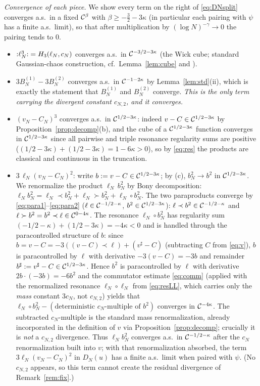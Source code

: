\emph{Convergence of each piece.}
We show every term on the right of \eqref{eq:DNsplit} converges a.s.\ in a fixed
$\mathcal{C}^{\beta}$ with $\beta\ge-\tfrac32-3\kappa$ (in particular each pairing with
$\psi$ has a finite a.s.\ limit), so that after multiplication by
$(\log N)^{-\gamma}\to0$ the pairing tends to $0$.
\begin{itemize}
\item[\rm(a)] ${:}\ell_N^3{:}=H_3(\ell_N,c_N)$ converges a.s.\ in
$\mathcal{C}^{-3/2-3\kappa}$ (the Wick cube; standard Gaussian-chaos construction, cf.\
Lemma~\ref{lem:cube} and \cite{CC18}).
\item[\rm(b)] $3B^{(1)}_N-3B^{(2)}_N$ converges a.s.\ in $\mathcal{C}^{-1-2\kappa}$ by
Lemma~\ref{lem:std}(ii), which is exactly the statement that $B^{(1)}_N$ and
$B^{(2)}_N$ converge. \emph{This is the only term carrying the divergent constant
$c_{N,2}$, and it converges.}
\item[\rm(c)] $(v_N-C_N)^3$ converges a.s.\ in $\mathcal{C}^{1/2-3\kappa}$: indeed
$v-C\in\mathcal{C}^{1/2-3\kappa}$ by Proposition~\ref{prop:decomp}(b), and the cube of a
$\mathcal{C}^{1/2-3\kappa}$ function converges in $\mathcal{C}^{1/2-3\kappa}$ since all pairwise
and triple resonance regularity sums are positive
($(1/2-3\kappa)+(1/2-3\kappa)=1-6\kappa>0$), so by \eqref{eq:res} the products are
classical and continuous in the truncation.
\item[\rm(d)] $3\,\ell_N(v_N-C_N)^2$: write $b:=v-C\in\mathcal{C}^{1/2-3\kappa}$; by (c),
$b_N^2\to b^2$ in $\mathcal{C}^{1/2-3\kappa}$. We renormalize the product
$\ell_N\,b_N^2$ by Bony decomposition:
$\ell_N b_N^2=\ell_N\prec b_N^2+\ell_N\succ b_N^2+\ell_N\circ b_N^2$. The two
paraproducts converge by \eqref{eq:para1}--\eqref{eq:para2}
($\ell\in\mathcal{C}^{-1/2-\kappa}$, $b^2\in\mathcal{C}^{1/2-3\kappa}$): $\ell\prec b^2\in
\mathcal{C}^{-1/2-\kappa}$ and $\ell\succ b^2=b^2\prec\ell\in\mathcal{C}^{0-4\kappa}$. The
resonance $\ell_N\circ b_N^2$ has regularity sum
$(-1/2-\kappa)+(1/2-3\kappa)=-4\kappa<0$ and is handled through the paracontrolled
structure of $b$: since $b=v-C=-3((v-C)\prec\ell)+(v^\sharp-C)$ (subtracting $C$
from \eqref{eq:v}), $b$ is paracontrolled by $\ell$ with derivative $-3(v-C)=-3b$
and remainder $b^\sharp:=v^\sharp-C\in\mathcal{C}^{1/2-3\kappa}$. Hence
$b^2$ is paracontrolled by $\ell$ with derivative $2b\cdot(-3b)=-6b^2$ and the
commutator estimate \eqref{eq:comm} (applied with the renormalized resonance
$\ell_N\circ\ell_N$ from \eqref{eq:resLL}, which carries only the
\emph{mass} constant $3c_N$, not $c_{N,2}$) yields that
$\ell_N\circ b_N^2-(\text{deterministic }c_N\text{-multiple of }b^2)$ converges in
$\mathcal{C}^{-4\kappa}$. The subtracted $c_N$-multiple is the standard mass
renormalization, already incorporated in the definition of $v$ via
Proposition~\ref{prop:decomp}; crucially it is \emph{not} a $c_{N,2}$ divergence.
Thus $\ell_N b_N^2$ converges a.s.\ in $\mathcal{C}^{-1/2-\kappa}$ after the $c_N$
renormalization built into $v$; with that renormalization absorbed, the term
$3\ell_N(v_N-C_N)^2$ in $D_N(u)$ has a finite a.s.\ limit when paired with
$\psi$. (No $c_{N,2}$ appears, so this term cannot create the residual divergence
of Remark~\ref{rem:fix}.)
\end{itemize}
